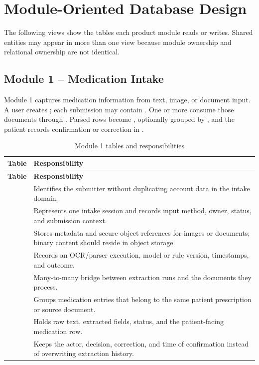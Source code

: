 \section{Module-Oriented Database Design}\label{sec:module-design}

The following views show the tables each product module reads or writes. Shared entities may appear in more than one view because module ownership and relational ownership are not identical.

\subsection{Module 1 -- Medication Intake}

Module 1 captures medication information from text, image, or document input. A user creates ; each submission may contain . One or more  consume those documents through . Parsed rows become , optionally grouped by , and the patient records confirmation or correction in .


\begin{longtable}{L{4.5cm}L{10.8cm}}
\caption{Module 1 tables and responsibilities}\label{tab:module1-tables}\\
\toprule
\textbf{Table} & \textbf{Responsibility}\\
\midrule
\endfirsthead
\toprule
\textbf{Table} & \textbf{Responsibility}\\
\midrule
\endhead
{} & Identifies the submitter without duplicating account data in the intake domain.\\
 & Represents one intake session and records input method, owner, status, and submission context.\\
 & Stores metadata and secure object references for images or documents; binary content should reside in object storage.\\
 & Records an OCR/parser execution, model or rule version, timestamps, and outcome.\\
 & Many-to-many bridge between extraction runs and the documents they process.\\
 & Groups medication entries that belong to the same patient prescription or source document.\\
 & Holds raw text, extracted fields, status, and the patient-facing medication row.\\
 & Keeps the actor, decision, correction, and time of confirmation instead of overwriting extraction history.\\
\bottomrule
\end{longtable}

